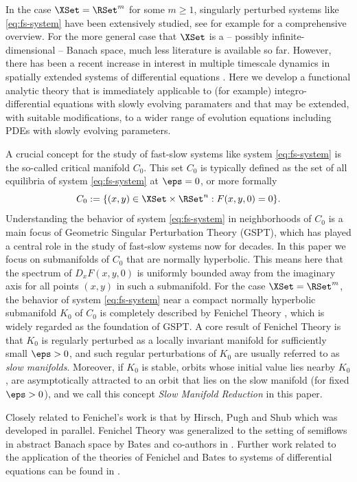 \documentclass[a4paper]{siamart190516}
\begin{document}
 In the case $\XSet = \RSet^m$ for some $m \geq 1$, singularly perturbed systems like
 \cref{eq:fs-system} 
 have been extensively studied, see for example
 \cite{Ku15} for a comprehensive overview. For the more general case that $\XSet$ is
 a -- possibly infinite-dimensional -- Banach space, much less literature is
 available so far. However, there has been a recent increase in interest in multiple timescale dynamics
 in spatially extended systems of differential equations \cite{Ro15, AvDe17, KaVo18,
 AvDe20, HuKu22, GoKaSc23, TsLi24, VoDoKa24, HuJeKu25, GoKaVo25, JeDoKa25}. Here we develop a functional analytic theory that is
 immediately applicable to (for example) integro-differential equations with slowly evolving
 paramaters and that may be extended, with suitable modifications, to a wider range of evolution equations including
 PDEs with slowly evolving parameters.
 
 A crucial concept for the study of fast-slow systems like system \cref{eq:fs-system} is the so-called critical manifold $C_0$. This set $C_0$ is
 typically defined as the set of all equilibria of system \cref{eq:fs-system} at
 $\eps = 0$, or more formally
 \[
 C_0 := \{ (x,y) \in \XSet \times \RSet^n: F(x,y,0)=0\}.
 \]
 Understanding the behavior of system \cref{eq:fs-system} in neighborhoods of $C_0$
 is a main focus of Geometric Singular Perturbation Theory (GSPT), which has played a
 central role in the study of fast-slow systems now for decades. In this paper we
 focus on submanifolds of $C_0$ that are normally hyperbolic. This means here that
 the spectrum of $D_x F(x,y,0)$ is uniformly bounded away from the imaginary axis for
 all points $(x,y)$ in such a submanifold. For the case $\XSet = \RSet^m$, the
 behavior of system \cref{eq:fs-system} near a compact normally hyperbolic
 submanifold $K_0$ of $C_0$ is completely described by Fenichel Theory \cite{Fe71,
 Fe74, Fe77, Fe79, Wi94}, which is widely regarded as the foundation of GSPT. 
A core result of Fenichel Theory is that $K_0$ is regularly perturbed as a locally invariant manifold
 for sufficiently small $\eps > 0$, and such regular perturbations of $K_0$ are usually
referred to as \textit{slow manifolds}. Moreover, if $K_0$ is stable, orbits whose initial 
value lies nearby $K_0$, are asymptotically attracted to an orbit that  lies on the 
slow manifold (for fixed $\eps > 0$), and we call this concept \textit{Slow Manifold Reduction}
 in this paper.
 
 Closely related to Fenichel's work is that by Hirsch, Pugh and Shub \cite{HiPuSh77}
 which was developed in parallel. Fenichel Theory was generalized to the setting
 of semiflows in abstract Banach space by Bates and co-authors in \cite{BaLuZe98,
 BaLuZe99, BaLuZe00}. Further work related to the application of the theories of
 Fenichel and Bates to systems of differential equations can be found in \cite{Jo94,
 Ka99, PlSe01, MeHa01, JoSh01, Ve05, BaLuZe08, He10, NiSt13, Ku15}.
 
\end{document}
